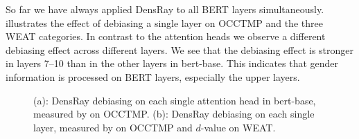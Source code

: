 So far we have always applied DensRay to all BERT layers
simultaneously.   illustrates the effect of
debiasing a single  layer on OCCTMP and the three
WEAT categories. In contrast to the attention heads we observe a different debiasing effect across different layers. We see that the debiasing effect is
stronger in layers 7--10 than in the other layers in
bert-base. This indicates that gender information is processed on BERT layers, especially the upper layers.
\begin{figure}[h]
	\centering
	\footnotesize
	\vspace{-5pt}  
	\setlength{\abovecaptionskip}{0.1cm}   
	\setlength{\belowcaptionskip}{0cm}
	\centering
	\caption{(a): DensRay debiasing on each single attention head in bert-base, measured by  on OCCTMP. (b): DensRay debiasing on each single layer, measured by  on  OCCTMP and $d$-value on WEAT.}
\end{figure}

